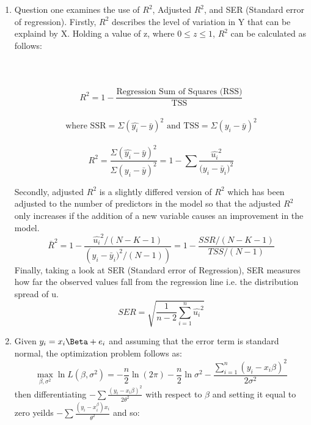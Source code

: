 \documentclass{article}
\begin{document}
\begin{enumerate}
    \item Question one examines the use of $R^2$, Adjusted $R^2$, and SER (Standard error of regression). Firstly, $R^2$ describes the level of variation in Y that can be explaind by X. Holding a value of z, where $0\leq z \leq 1$, $R^2$ can be calculated as follows:
    \hspace{1.27cm}\\
    \hspace{1.27cm}\\
    \hspace{1.27cm}\\
    \hspace{1.27cm}\\
    \begin{equation}
        R^2 = 1- \frac{\mbox{Regression Sum of Squares (RSS)}}{\mbox{TSS}}
    \end{equation}
    \hspace{1.27cm}\\
        $$\mbox{where SSR} = \Sigma (\hat{y_{i}} - \bar{y})^2 \mbox{ and TSS} = \Sigma (y_{i} - \bar{y})^2$$
    \hspace{1.27cm}\\
   $$ R^2 = \frac{\Sigma (\hat{y_{i}} - \bar{y})^2}{\Sigma (y_{i} - \bar{y})^2}= 1- \sum \frac{\hat{u_{i}}^2}{({y_{i} -\bar{y}_{i})^2}}$$
   
   Secondly, adjusted $R^2$ is a slightly differed version of $R^2$ which has been adjusted to the number of predictors in the model so that the adjusted $R^2$ only increases if the addition of a new variable causes an improvement in the model.
   \begin{equation}
  \bar{R}^2 = 1- \frac{\hat{u_{i}}^2/ (N - K - 1)}{({y_{i}-\bar{y}_{i})^2}/(N-1))} = 1- \frac{SSR/(N-K-1)}{TSS/(N-1)}
   \end{equation}
   Finally, taking a look at SER (Standard error of Regression), SER measures how far the observed values fall from the regression line i.e. the distribution spread of u.
   \begin{equation}
    SER = \sqrt{\frac{1}{n-2} \sum_{i=1}^{n}\hat{u_{i}}^2}
    \end{equation}
    
    \item Given $y_{i} = x_{i}\Beta +e_{i}$ and assuming that the error term is standard normal, the optimization problem follows as:
    \begin{equation}
     \max_{\beta ,\sigma^2}\ln L(\beta ,\sigma^2)= - \frac{n}{2}\ln(2\pi)-\frac{n}{2}\ln\sigma^2 - \frac{\sum^n_{i=1}(y_i - x_i\beta)^2} {2\sigma^2} 
    \end{equation}
   then differentiating $-\sum \frac{(y_{i}-x_{i}\beta)^2}{2\theta^2}$ with respect to $\beta$ and setting it equal to zero yeilds $-\sum \frac{(y_{i}-x_{i}^\beta)x_{i}}{\theta^2}$ and so:


\end{enumerate}
\end{document}
